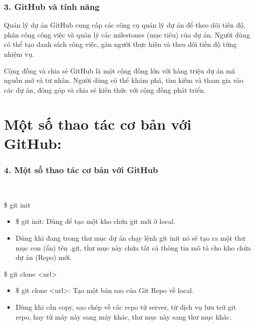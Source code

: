 \documentclass{beamer}
\begin{document}
\begin{frame}
\frametitle{ 3. GitHub và tính năng}

\begin{block}{ Quản lý dự án}
GitHub cung cấp các công cụ quản lý dự án để theo dõi tiến độ, phân công công việc và quản lý các milestones (mục tiêu) của dự án. Người dùng có thể tạo danh sách công việc, gán người thực hiện và theo dõi tiến độ từng nhiệm vụ.
\end{block}
\begin{block}{ Cộng đồng và chia sẻ}
GitHub là một cộng đồng lớn với hàng triệu dự án mã nguồn mở và tư nhân. Người dùng có thể khám phá, tìm kiếm và tham gia vào các dự án, đóng góp và chia sẻ kiến thức với cộng đồng phát triển.
\end{block}

\end{frame}





\section{Một số thao tác cơ bản với GitHub:} 



\begin{frame}
\frametitle{ 4. Một số thao tác cơ bản với GitHub}

\\
\begin{block}{ \$ git init}
\begin{itemize}
\item \$ git init: Dùng để tạo một kho chứa git mới ở local. 
\item Dùng khi đang trong thư mục dự án chạy lệnh git init nó sẽ tạo ra một thư mục con (ẩn) tên .git, thư mục này chứa tất cả thông tin mô tả cho kho chứa dự án (Repo) mới.
\end{itemize}

\end{block}
\begin{block}{ \$ git clone <url>}
\begin{itemize}
\item \$ git clone <url>: Tạo một bản sao của Git Repo về local.
\item Dùng khi cần copy, sao chép về các repo từ server, từ dịch vụ lưu trữ git repo, hay từ máy này sang máy khác, thư mục này sang thư mục khác.
\end{itemize}

\end{block}
\end{frame}
\end{document}
